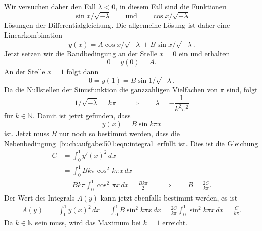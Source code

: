 \begin{loesung}
Wir versuchen daher den Fall $\lambda<0$, in diesem Fall sind die
Funktionen
\[
\sin x/\!\sqrt{-\lambda}
\qquad\text{und}\qquad
\cos x/\!\sqrt{-\lambda}
\]
Lösungen der Differentialgleichung.
Die allgemeine Lösung ist daher eine Linearkombination
\[
y(x)
=
A \cos  x/\!\sqrt{-\lambda}
+
B \sin  x/\!\sqrt{-\lambda}.
\]
Jetzt setzen wir die Randbedingung an der Stelle $x=0$ ein und erhalten
\[
0
=
y(0)
=
A.
\]
An der Stelle $x=1$ folgt dann
\[
0=y(1)
=
B\sin 1/\!\sqrt{-\lambda}.
\]
Da die Nullstellen der Sinusfunktion die ganzzahligen Vielfachen von $\pi$
sind, folgt
\[
1/\!\sqrt{-\lambda} = k\pi
\qquad\Rightarrow\qquad
\lambda = -\frac{1}{k^2\pi^2}
\]
für $k\in\mathbb{N}$.
Damit ist jetzt gefunden, dass
\[
y(x) = B \sin k\pi x
\]
ist.
Jetzt muss $B$ nur noch so bestimmt werden, dass die
Nebenbedingung~\ref{buch:aufgabe:501:eqn:integral} erfüllt ist.
Dies ist die Gleichung
\begin{align*}
C
&=
\int_0^1 y'(x)^2\,dx
\\
&=
\int_0^1 B k\pi \cos^2 k\pi x\,dx
\\
&=
Bk\pi \int_0^1 \cos^2 \pi x\,dx
=
\frac{Bk\pi}2
\qquad
\Rightarrow
\qquad
B
=
\frac{2C}{k\pi}.
\end{align*}
Der Wert des Integrals $A(y)$ kann jetzt ebenfalls bestimmt werden, es
ist
\begin{align*}
A(y)
&=
\int_0^1 y(x)^2\,dx
=
\int_0^1 B\sin^2 k\pi x\,dx
=
\frac{2C}{k\pi} \int_0^1 \sin^2k\pi x\,dx
=
\frac{C}{k\pi}.
\end{align*}
Da $k\in\mathbb{N}$ sein muss, wird das Maximum bei $k=1$ erreicht.
\end{loesung}
